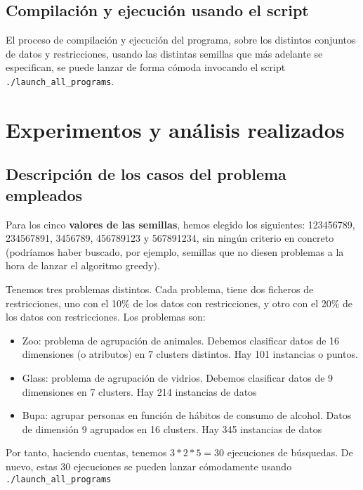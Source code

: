 \documentclass[11pt]{article}
\begin{document}
\subsection{Compilación y ejecución usando el script}

El proceso de compilación y ejecución del programa, sobre los distintos conjuntos de datos y restricciones, usando las distintas semillas que más adelante se especifican, se puede lanzar de forma cómoda invocando el script \lstinline{./launch_all_programs}.

\pagebreak

\section{Experimentos y análisis realizados}

\subsection{Descripción de los casos del problema empleados}

Para los cinco \textbf{valores de las semillas}, hemos elegido los siguientes: 123456789, 234567891, 3456789, 456789123 y 567891234, sin ningún criterio en concreto (podríamos haber buscado, por ejemplo, semillas que no diesen problemas a la hora de lanzar el algoritmo greedy).

Tenemos tres problemas distintos. Cada problema, tiene dos ficheros de restricciones, uno con el 10\% de los datos con restricciones, y otro con el 20\% de los datos con restricciones. Los problemas son:

\begin{itemize}
    \item Zoo: problema de agrupación de animales. Debemos clasificar datos de 16 dimensiones (o atributos) en 7 clusters distintos. Hay 101 instancias o puntos.
    \item Glass: problema de agrupación de vidrios. Debemos clasificar datos de 9 dimensiones en 7 clusters. Hay 214 instancias de datos
    \item Bupa: agrupar personas en función de hábitos de consumo de alcohol. Datos de dimensión 9 agrupados en 16 clusters. Hay 345 instancias de datos
\end{itemize}

Por tanto, haciendo cuentas, tenemos $3 * 2 * 5 = 30$ ejecuciones de búsquedas. De nuevo, estas 30 ejecuciones se pueden lanzar cómodamente usando \lstinline{./launch_all_programs}
\end{document}
